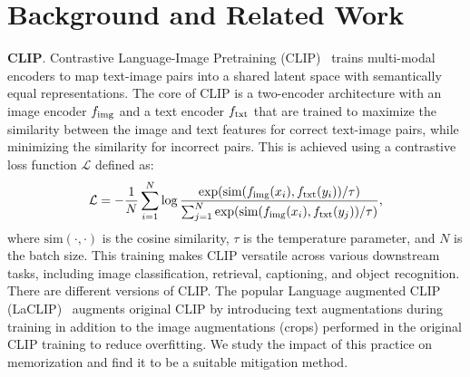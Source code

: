 \section{Background and Related Work}



\textbf{CLIP}.
Contrastive Language-Image Pretraining (CLIP)~\citep{radford2021} trains multi-modal encoders to map text-image pairs into a shared latent space with semantically equal representations.
The core of CLIP is a two-encoder architecture with an image encoder $f_{\text{img}}$ and a text encoder $f_{\text{txt}}$ that are trained to maximize the similarity between the image and text features for correct text-image pairs, while minimizing the similarity for incorrect pairs. This is achieved using a contrastive loss function $\mathcal{L}$ defined as:
\begin{align*}
\mathcal{L} = - \frac{1}{N} \sum_{i=1}^{N} \log \frac{\exp(\text{sim}(f_{\text{img}}(x_i), f_{\text{txt}}(y_i)) / \tau)}{\sum_{j=1}^{N} \exp(\text{sim}(f_{\text{img}}(x_i), f_{\text{txt}}(y_j)) / \tau)},
\end{align*}
where $\text{sim}(\cdot, \cdot)$ is the cosine similarity,  $\tau$  is the temperature parameter, and $N$ is the batch size.
This training makes CLIP versatile across various downstream tasks, including image classification, retrieval, captioning, and object recognition.
There are different versions of CLIP.
The popular Language augmented CLIP (LaCLIP)~\citep{fan2023} augments original CLIP by introducing text augmentations during training in addition to the image augmentations (crops) performed in the original CLIP training to reduce overfitting.
We study the impact of this practice on memorization and find it to be a suitable mitigation method.


